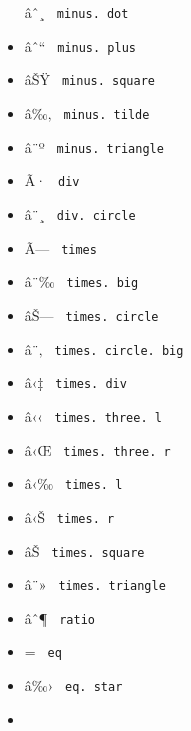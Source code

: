 \begin{itemize}
  \label{symbol-minus.dot}{{ âˆ¸ }
  \texttt{\ minus.\ dot\ }}
\item
  \label{symbol-minus.plus}{{ âˆ`` }
  \texttt{\ minus.\ plus\ }}
\item
  \label{symbol-minus.square}{{ âŠŸ }
  \texttt{\ minus.\ square\ }}
\item
  \label{symbol-minus.tilde}{{ â‰‚ }
  \texttt{\ minus.\ tilde\ }}
\item
  \label{symbol-minus.triangle}{{ â¨º }
  \texttt{\ minus.\ triangle\ }}
\item
  \label{symbol-div}{{ Ã· } \texttt{\ div\ }}
\item
  \label{symbol-div.circle}{{ â¨¸ }
  \texttt{\ div.\ circle\ }}
\item
  \label{symbol-times}{{ Ã--- } \texttt{\ times\ }}
\item
  \label{symbol-times.big}{{ â¨‰ }
  \texttt{\ times.\ big\ }}
\item
  \label{symbol-times.circle}{{ âŠ--- }
  \texttt{\ times.\ circle\ }}
\item
  \label{symbol-times.circle.big}{{ â¨‚ }
  \texttt{\ times.\ circle.\ big\ }}
\item
  \label{symbol-times.div}{{ â‹‡ }
  \texttt{\ times.\ div\ }}
\item
  \label{symbol-times.three.l}{{ â‹‹ }
  \texttt{\ times.\ three.\ l\ }}
\item
  \label{symbol-times.three.r}{{ â‹Œ }
  \texttt{\ times.\ three.\ r\ }}
\item
  \label{symbol-times.l}{{ â‹‰ } \texttt{\ times.\ l\ }}
\item
  \label{symbol-times.r}{{ â‹Š } \texttt{\ times.\ r\ }}
\item
  \label{symbol-times.square}{{ âŠ }
  \texttt{\ times.\ square\ }}
\item
  \label{symbol-times.triangle}{{ â¨» }
  \texttt{\ times.\ triangle\ }}
\item
  \label{symbol-ratio}{{ âˆ¶ } \texttt{\ ratio\ }}
\item
  \label{symbol-eq}{{ = } \texttt{\ eq\ }}
\item
  \label{symbol-eq.star}{{ â‰› } \texttt{\ eq.\ star\ }}
\item

\end{itemize}

